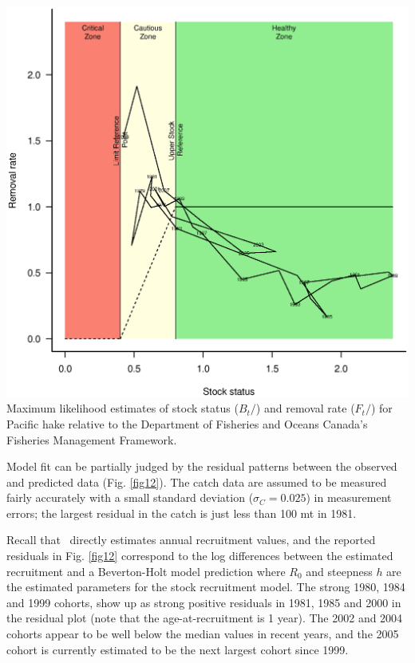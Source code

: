 \begin{multicols}{2}
\begin{figurehere}
	\centering
	\includegraphics[width=0.95\columnwidth]{iscamFigs/phakefig8.eps}\\
	\caption{Maximum likelihood estimates of stock status ($B_t/$\bmsy) and removal rate ($F_t/$\fmsy) for Pacific hake relative to the Department of Fisheries and Oceans Canada's  Fisheries Management Framework.}\label{fig11}
\end{figurehere}

Model fit can be partially judged by the residual patterns between the observed and predicted data (Fig. \ref{fig12}).  The catch data are assumed to be measured fairly accurately with a small standard deviation ($\sigma_C=0.025$) in measurement errors; the largest residual in the catch is just less than 100 mt in 1981.  

Recall that \iscam\ directly estimates annual recruitment values, and the reported residuals in Fig. \ref{fig12} correspond to the log differences between the estimated recruitment and a Beverton-Holt model prediction where $R_0$ and steepness $h$ are the estimated parameters for the stock recruitment model.  The strong 1980, 1984 and 1999 cohorts, show up as strong positive residuals in 1981, 1985 and 2000 in the residual plot (note that the age-at-recruitment is 1 year).  The 2002 and 2004 cohorts appear to be well below the median values in recent years, and the 2005 cohort is currently estimated to be the next largest cohort since 1999.


\end{multicols}
